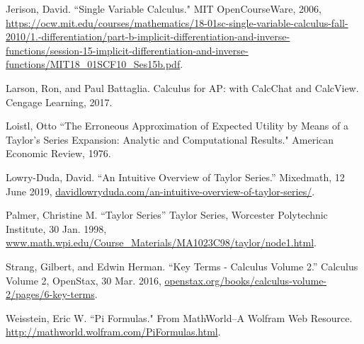 \documentclass[12pt, titlepage]{article}
\begin{document}
\newpage
\begin{thebibliography}{thewidest}
  Jerison, David. ``Single Variable Calculus." MIT OpenCourseWare, 2006, \url{https://ocw.mit.edu/courses/mathematics/18-01sc-single-variable-calculus-fall-2010/1.-differentiation/part-b-implicit-differentiation-and-inverse-functions/session-15-implicit-differentiation-and-inverse-functions/MIT18_01SCF10_Ses15b.pdf}.

  Larson, Ron, and Paul Battaglia. Calculus for AP: with CalcChat and CalcView. Cengage Learning, 2017.

  Loistl, Otto ``The Erroneous Approximation of Expected Utility by Means of a Taylor's Series Expansion: Analytic and Computational Results." American Economic Review, 1976.

  Lowry-Duda, David. ``An Intuitive Overview of Taylor Series.” Mixedmath, 12 June 2019, \url{davidlowryduda.com/an-intuitive-overview-of-taylor-series/}.

  Palmer, Christine M. ``Taylor Series” Taylor Series, Worcester Polytechnic Institute, 30 Jan. 1998, \url{www.math.wpi.edu/Course_Materials/MA1023C98/taylor/node1.html}.

  Strang, Gilbert, and Edwin Herman. ``Key Terms - Calculus Volume 2.” Calculus Volume 2, OpenStax, 30 Mar. 2016, \url{openstax.org/books/calculus-volume-2/pages/6-key-terms}.

  Weisstein, Eric W. ``Pi Formulas." From MathWorld--A Wolfram Web Resource. \url{http://mathworld.wolfram.com/PiFormulas.html}.
\end{thebibliography}
\end{document}
